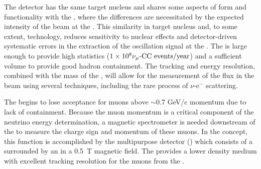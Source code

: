 The  detector has the same target nucleus and shares some aspects of form and functionality with the , where the differences are necessitated by the expected intensity of the beam at the .  This similarity in target nucleus and, to some extent, technology, reduces sensitivity to nuclear effects and detector-driven systematic errors in the extraction of the oscillation signal at the  .  The  is large enough to provide high statistics ($\num{1e8}{\numu \text{-CC events/year}}$) and a sufficient volume to provide good hadron containment.  The tracking and energy resolution, combined with the mass of the , will allow for the measurement of the flux in the beam using several techniques, including the rare process of $\nu$-e$^{-}$ scattering.

The  begins to lose acceptance for muons above $\sim$0.7 GeV/c momentum due to lack of containment.  Because the muon momentum is a critical component of the neutrino energy determination, a magnetic spectrometer is needed downstream of the  to measure the charge sign and momentum of these muons.  In the   concept, this function is accomplished by the multipurpose detector () which consists of a  surrounded by an  in a \SI{0.5}{T} magnetic field. The  provides a lower density medium with excellent tracking resolution for the muons from the .  %


